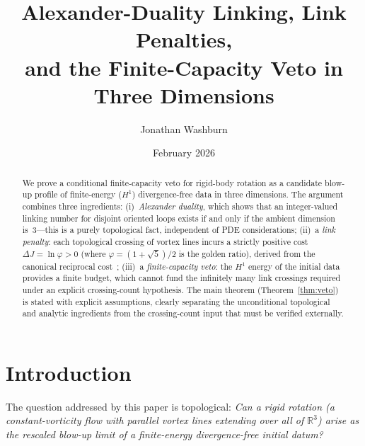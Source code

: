 \documentclass[11pt]{amsart}
\title[Topological Capacity Veto in $D{=}3$]{Alexander-Duality Linking, Link Penalties,\\
and the Finite-Capacity Veto in Three Dimensions}
\author{Jonathan Washburn}
\date{February 2026}
\theoremstyle{definition}
\theoremstyle{remark}
\newcommand{\R}{\mathbb{R}}
\begin{document}
\begin{abstract}
We prove a conditional finite-capacity veto for rigid-body rotation as a
candidate blow-up profile of finite-energy ($H^1$) divergence-free data in
three dimensions.
The argument combines three ingredients:
(i)~\emph{Alexander duality}, which shows that an integer-valued linking
number for disjoint oriented loops exists if and only if the ambient
dimension is~$3$---this is a purely topological fact, independent of PDE
considerations;
(ii)~a \emph{link penalty}: each topological crossing of vortex
lines incurs a strictly positive cost $\Delta J=\ln\varphi>0$
(where $\varphi=(1+\sqrt{5})/2$ is the golden ratio), derived from the
canonical reciprocal cost~\cite{F1};
(iii)~a \emph{finite-capacity veto}: the $H^1$ energy of the initial data
provides a finite budget, which cannot fund the infinitely many link
crossings required under an explicit crossing-count hypothesis.
The main theorem (Theorem~\ref{thm:veto}) is stated with explicit
assumptions, clearly separating the unconditional topological and
analytic ingredients from the crossing-count input that must be verified
externally.
\end{abstract}

\maketitle

\section{Introduction}\label{sec:intro}

The question addressed by this paper is topological:
\emph{Can a rigid rotation (a constant-vorticity flow with parallel vortex
lines extending over all of $\R^3$) arise as the rescaled blow-up limit
of a finite-energy divergence-free initial datum?}
\end{document}
